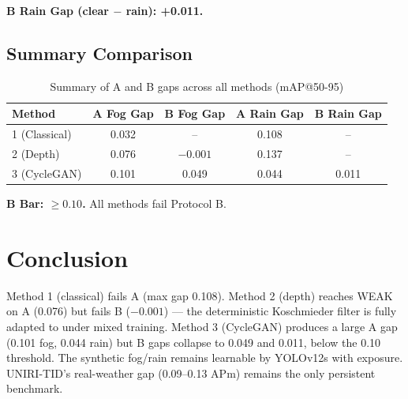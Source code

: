 \documentclass[11pt,a4paper]{article}
\begin{document}
\textbf{B Rain Gap (clear $-$ rain): +0.011.}

\subsection{Summary Comparison}

\begin{table}[H]
\centering
\caption{Summary of A and B gaps across all methods (mAP@50-95)}
\label{tab:summary}
\begin{tabular}{lcccc}
\toprule
Method & A Fog Gap & B Fog Gap & A Rain Gap & B Rain Gap \\
\midrule
1 (Classical) & 0.032 & -- & 0.108 & -- \\
2 (Depth) & 0.076 & $-0.001$ & 0.137 & -- \\
3 (CycleGAN) & 0.101 & 0.049 & 0.044 & 0.011 \\
\bottomrule
\end{tabular}
\end{table}

\textbf{B Bar: $\geq 0.10$.} All methods fail Protocol B.

\section{Conclusion}

Method 1 (classical) fails A (max gap 0.108). Method 2 (depth) reaches WEAK on A (0.076) but fails B ($-0.001$) --- the deterministic Koschmieder filter is fully adapted to under mixed training. Method 3 (CycleGAN) produces a large A gap (0.101 fog, 0.044 rain) but B gaps collapse to 0.049 and 0.011, below the 0.10 threshold. The synthetic fog/rain remains learnable by YOLOv12s with exposure. UNIRI-TID's real-weather gap (0.09--0.13 APm) remains the only persistent benchmark.
\end{document}
